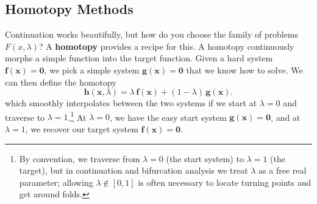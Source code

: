 \subsection{Homotopy Methods}
Continuation works beautifully, but how do you choose the family of problems $F(x, \lambda)$? A \textbf{homotopy} provides a recipe for this. A homotopy continuously morphs a simple function into the target function. Given a hard system $\mathbf{f}(\mathbf{x}) = \mathbf{0}$, we pick a simple system $\mathbf{g}(\mathbf{x}) = \mathbf{0}$ that we know how to solve. We can then define the homotopy
\begin{equation}
    \mathbf{h}(\mathbf{x}, \lambda) = \lambda\,\mathbf{f}(\mathbf{x}) + (1-\lambda)\,\mathbf{g}(\mathbf{x}).
\end{equation}
which smoothly interpolates between the two systems if we start at \(\lambda=0\) and traverse to \(\lambda=1\).\footnote{By convention, we traverse from \(\lambda=0\) (the start system) to \(\lambda=1\) (the target), but in continuation and bifurcation analysis we treat \(\lambda\) as a free real parameter; allowing \(\lambda\notin[0,1]\) is often necessary to locate turning points and get around folds.
} At $\lambda=0$, we have the easy start system $\mathbf{g}(\mathbf{x}) = \mathbf{0}$, and at $\lambda=1$, we recover our target system $\mathbf{f}(\mathbf{x}) = \mathbf{0}$.

